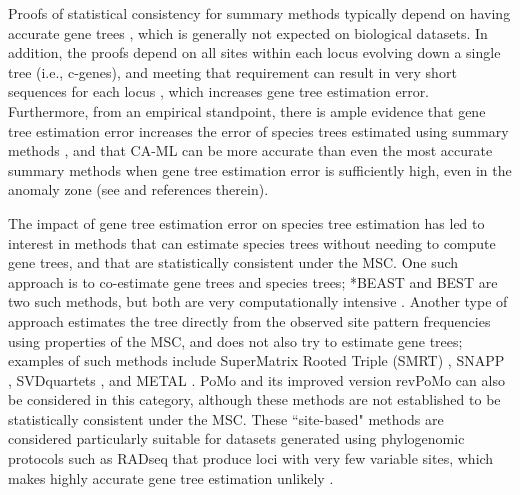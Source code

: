 Proofs of statistical consistency for summary methods typically
depend on having accurate gene trees \cite{roch2015robustness}, which
is generally not expected on biological datasets.  In addition, the
proofs depend on all  sites within each locus evolving down a single tree (i.e., c-genes), and
meeting that requirement can result in very short sequences for each
locus \cite{SpringerGatesy2016}, which increases gene tree estimation
error.  
Furthermore, from an empirical standpoint, there is ample evidence that
gene tree estimation error increases the error of
species trees estimated using summary methods
\cite{huang2010sources,patel2013error,DeGiorgioDegnan2014,GatesyMPE2014,bayzid2013naive,mirarab2014evaluating,SpringerGatesy2016,Meiklejohn2016,MolloyWarnow2017},
and that CA-ML can be more accurate than even the most accurate summary methods when gene tree estimation error is sufficiently high, even in the anomaly zone (see \cite{MolloyWarnow2017} and references therein).

The impact of gene tree estimation error on species tree estimation
has led to interest in methods that can estimate species trees without
needing to compute gene trees, and that are statistically consistent under the MSC.
One such approach is to co-estimate gene
trees and species trees; *BEAST \cite{StarBEAST} and BEST
\cite{Liu2008} are two such methods, but both are very
computationally intensive 
\cite{bayzid2013naive,bbca,knowles2009estimating,mccormack,leavitt2016resolving}.
Another type of approach estimates the tree directly from the observed site pattern frequencies using properties of the MSC,
and does not also try to estimate gene trees; examples of such methods include   
SuperMatrix Rooted Triple (SMRT) \cite{DeGiorgio2010}, SNAPP \cite{bryant2012inferring}, SVDquartets \cite{chifman2014quartet}, and METAL \cite{metal,MosselRoch2015}.
 PoMo \cite{pomo} and its improved version revPoMo \cite{revPomo} can also be considered in this category, although these methods are not established to be statistically consistent under the MSC.
These ``site-based" methods are considered
particularly suitable for  datasets generated using phylogenomic protocols such
as RADseq that produce  
  loci with very few variable sites, which makes highly accurate gene tree estimation 
unlikely
\cite{de2017phylogenomics}.

